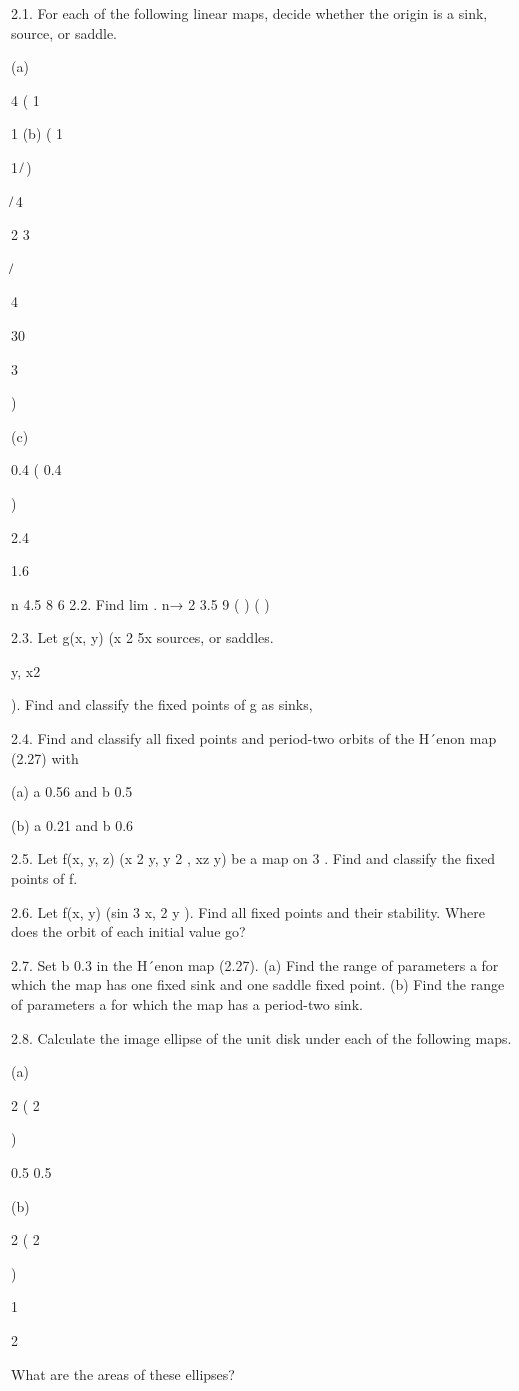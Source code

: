 \documentclass[12pt]{article}
\begin{document}
{2.1. For each of the following linear maps, decide whether the origin is a sink, source, or saddle.

(a)

4 ( 1

1 (b) ( 1

1 ̸ )

̸ 4

2 3

̸

4

30

3

)

(c)

0.4 ( 0.4

)

2.4

1.6

n 4.5 8 6 2.2. Find lim . n→  2 3.5 9 ( ) ( )

2.3. Let g(x, y)  (x 2  5x sources, or saddles.

 y, x2 

). Find and classify the ﬁxed points of g as sinks,

2.4. Find and classify all ﬁxed points and period-two orbits of the H´enon map (2.27) with

(a) a  0.56 and b  0.5

(b) a  0.21 and b  0.6

2.5. Let f(x, y, z)  (x 2 y, y 2 , xz  y) be a map on  3 . Find and classify the ﬁxed points of f.

2.6. Let f(x, y)  (sin 3  x, 2 y ). Find all ﬁxed points and their stability. Where does the orbit of each initial value go?

2.7. Set b  0.3 in the H´enon map (2.27). (a) Find the range of parameters a for which the map has one ﬁxed sink and one saddle 
ﬁxed point. (b) Find the range of parameters a for which the map has a period-two sink.

2.8. Calculate the image ellipse of the unit disk under each of the following maps.

(a)

2 ( 2

)

0.5 0.5

(b)

2 ( 2

)

1

2

What are the areas of these ellipses?

}
\end{document}
